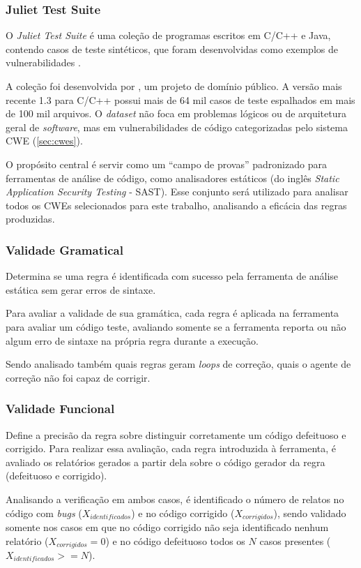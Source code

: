 \documentclass[
    12pt,                %
    openright,           %
    oneside,             %
    a4paper,             %
    english,             %
    brazil               %
]{abntex2}
\begin{document}
\begin{itemize}
\subsubsection{Juliet Test Suite}
\label{sec:juliet}
\par
O \textit{Juliet Test Suite} é uma coleção de programas escritos em C/C++ e Java, contendo casos de teste sintéticos, que foram desenvolvidas como exemplos de vulnerabilidades \cite{nistsard112juliet}.
\par
A coleção foi desenvolvida por , um projeto de domínio público.
A versão mais recente 1.3 para C/C++ possui mais de 64 mil casos de teste espalhados em mais de 100 mil arquivos.
O \textit{dataset} não foca em problemas lógicos ou de arquitetura geral de \textit{software}, mas em vulnerabilidades de código categorizadas pelo sistema CWE (\ref{sec:cwes}).
\par
O propósito central é servir como um ``campo de provas'' padronizado para ferramentas de análise de código, como analisadores estáticos (do inglês \textit{Static Application Security Testing} - SAST).
Esse conjunto será utilizado para analisar todos os CWEs selecionados para este trabalho, analisando a eficácia das regras produzidas.

\subsubsection{Validade Gramatical}
\label{sec:validadegramatica}
\par
Determina se uma regra é identificada com sucesso pela ferramenta de análise estática sem gerar erros de sintaxe.
\par
Para avaliar a validade de sua gramática, cada regra é aplicada na ferramenta para avaliar um código teste, avaliando somente se a ferramenta reporta ou não algum erro de sintaxe na própria regra durante a execução. 
\par
Sendo analisado também quais regras geram \textit{loops} de correção, quais o agente de correção não foi capaz de corrigir.

\subsubsection{Validade Funcional}
\label{sec:validadefuncional}
\par
Define a precisão da regra sobre distinguir corretamente um código defeituoso e corrigido.
Para realizar essa avaliação, cada regra introduzida à ferramenta, é avaliado os relatórios gerados a partir dela sobre o código gerador da regra (defeituoso e corrigido).
\par
Analisando a verificação em ambos casos, é identificado o número de relatos no código com \textit{bugs} ($X_{identificados}$) e no código corrigido ($X_{corrigidos}$), sendo validado somente nos casos em que no código corrigido não seja identificado nenhum relatório ($X_{corrigidos} = 0$) e no código defeituoso todos os $N$ casos presentes ($X_{identificados} >= N$).


\end{itemize}
\end{document}
